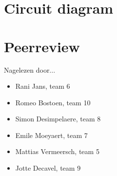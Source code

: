 \documentclass[a4paper,kulak]{kulakarticle}
\begin{document}
\begin{appendices}
\begin{table}[h!]
\begin{tabular}{|l|r|r|r|}
	\end{tabular}
\end{table}


\section{Circuit diagram}


\section{Peerreview}

\large Nagelezen door... \

\begin{itemize}
	\item Rani Jans, team 6
	\item Romeo Bostoen, team 10
	\item Simon Desimpelaere, team 8
	\item Emile Moeyaert, team 7
	\item Mattias Vermeersch, team 5
	\item Jotte Decavel, team 9
\end{itemize}



\end{appendices}
\end{document}
